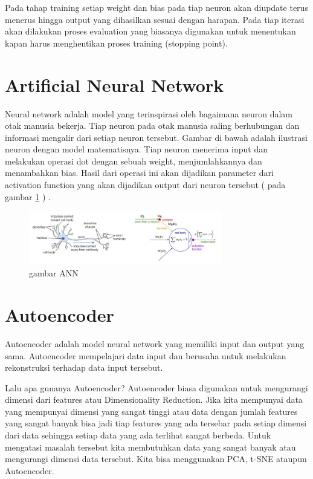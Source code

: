 Pada tahap training setiap weight dan bias pada tiap neuron akan diupdate terus menerus hingga output yang dihasilkan sesuai dengan harapan. Pada tiap iterasi akan dilakukan proses evaluation yang biasanya digunakan untuk menentukan kapan harus menghentikan proses training (stopping point).


\section{Artificial Neural Network}
Neural network adalah model yang terinspirasi oleh bagaimana neuron dalam otak manusia bekerja. Tiap neuron pada otak manusia saling berhubungan dan informasi mengalir dari setiap neuron tersebut. Gambar di bawah adalah ilustrasi neuron dengan model matematisnya. Tiap neuron menerima input dan melakukan operasi dot dengan sebuah weight, menjumlahkannya dan menambahkan bias. Hasil dari operasi ini akan dijadikan parameter dari activation function yang akan dijadikan output dari neuron tersebut ( pada gambar \ref{Artificial} ) .

\begin{figure}[!htp]
	\includegraphics[width=0.75\textwidth]{figures/ArtificialNeuralNetwork.PNG}
	\caption{gambar ANN }
	\label{Artificial}
\end{figure}

\section{Autoencoder}
Autoencoder adalah model neural network yang memiliki input dan output yang sama. Autoencoder mempelajari data input dan berusaha untuk melakukan rekonstruksi terhadap data input tersebut.

Lalu apa gunanya Autoencoder? Autoencoder biasa digunakan untuk mengurangi dimensi dari features atau Dimensionality Reduction. Jika kita mempunyai data yang mempunyai dimensi yang sangat tinggi atau data dengan jumlah features yang sangat banyak bisa jadi tiap features yang ada tersebar pada setiap dimensi dari data sehingga setiap data yang ada terlihat sangat berbeda. Untuk mengatasi masalah tersebut kita membutuhkan data yang sangat banyak atau mengurangi dimensi data tersebut. Kita bisa menggunakan PCA, t-SNE ataupun Autoencoder.


